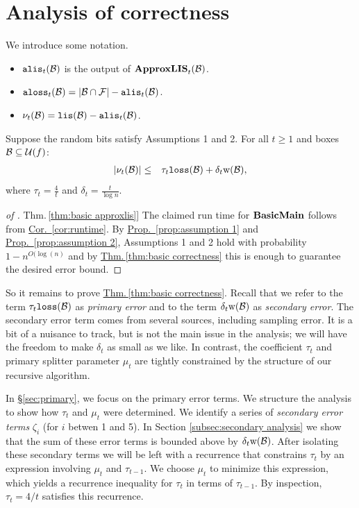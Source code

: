 \documentclass{acmsmall}
\newcommand{\cB}{{\cal B}}
\newcommand{\cF}{{\cal F}}
\newcommand{\cU}{{\cal U}}
\newcommand{\Sec}[1]{\hyperref[sec:#1]{\S\ref*{sec:#1}}} %
\newcommand{\Thm}[1]{\hyperref[thm:#1]{Thm.\,\ref*{thm:#1}}} %
\newcommand{\Prop}[1]{\hyperref[prop:#1]{Prop.~\ref*{prop:#1}}} %
\newcommand{\Cor}[1]{\hyperref[cor:#1]{Cor.~\ref*{cor:#1}}} %
\newcommand{\lis}{{\tt lis}}
\newcommand{\loss}{{\tt loss}}
\newcommand{\alis}{{\tt alis}}
\newcommand{\aloss}{{\tt aloss}}
\newcommand{\width}{{\bf {\rm  w}}}
\newcommand{\errorterm}{\zeta}
\newcommand{\basicmain}{{\rm {\bf BasicMain}}}
\newcommand{\approxlis}{{\rm {\bf ApproxLIS}}}
\newcommand{\liserror}{\nu}
\begin{document}
\section{Analysis of correctness}
\label{sec:correctness}



We introduce some notation.

\begin{itemize}
\item $\alis_t(\cB)$ is the output of $\approxlis_t(\cB)$.
\item $\aloss_t(\cB)=|\cB \cap \cF| - \alis_t(\cB)$.
\item $\liserror_t(\cB)=\lis(\cB)-\alis_t(\cB)$.
\end{itemize}

\begin{theorem}
\label{thm:basic correctness}
Suppose the random bits satisfy Assumptions 1 and 2. For all $t \geq 1$ and boxes $\cB \subseteq \cU(f)$:
%
\begin{eqnarray}
\label{goal 1}
|\liserror_t(\cB)| & \leq & \tau_t\loss(\cB)+\delta_t \width(\cB),
\end{eqnarray}
where $\tau_t=\frac{4}{t}$ and $\delta_t=\frac{t}{\log n}$.
\end{theorem}

\begin{proof}[of \Thm{basic approxlis}]  The claimed run time for
$\basicmain$ follows from \Cor{runtime}.  By \Prop{assumption 1} and \Prop{assumption 2},
Assumptions 1 and 2 hold with probability $1-n^{O(\log(n)}$ and by \Thm{basic correctness} this is enough
to guarantee the desired error bound.
\end{proof}




So it remains to prove \Thm{basic correctness}.
Recall that we refer to the term $\tau_t \loss(\cB)$ as {\em primary error} and  to 
the term $\delta_t \width(\cB)$ as {\em secondary error}.
The secondary error term comes from several sources, including sampling error.
It is a bit of a nuisance to track, but is not the main issue in the analysis;
we will have the
freedom to make $\delta_t$ as small as we like. In contrast, 
the coefficient  $\tau_t$ and primary splitter parameter $\mu_t$ are 
tightly constrained by the structure of our recursive algorithm.


In \Sec{primary},
we focus on the primary error terms. We structure the analysis to show how $\tau_t$ and  $\mu_t$ were determined. We identify 
a series of \emph{secondary error terms} $\errorterm_i$ (for $i$ betwen 1 and 5).
In Section \ref{subsec:secondary analysis} we show that the sum of these error terms is bounded above by $\delta_t \width(\cB)$. 
After isolating these secondary terms we will be left
with a recurrence that constrains $\tau_t$ by an expression involving $\mu_t$ and $\tau_{t-1}$. We 
choose $\mu_t$ to minimize this expression, which yields a recurrence inequality for $\tau_t$ in terms of
$\tau_{t-1}$. By inspection, $\tau_t=4/t$ satisfies this recurrence.
\end{document}
